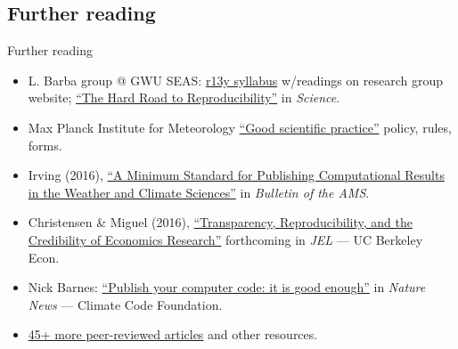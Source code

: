 \documentclass[12pt,aspectratio=169]{beamer}
\begin{document}
\subsection{Further reading}
\begin{frame}{Further reading}
\begin{itemize}
  \small
  \item L. Barba group @ GWU SEAS: \href{http://lorenabarba.com/blog/barbagroup-reproducibility-syllabus/}{r13y syllabus} w/readings on research group website; \href{http://science.sciencemag.org/content/354/6308/142}{``The Hard Road to Reproducibility''} in \emph{Science}.
  \item Max Planck Institute for Meteorology \href{http://mpimet.mpg.de/en/science/publications/good-scientific-practice.html}{``Good scientific practice''} policy, rules, forms.
  \item Irving (2016), \href{http://journals.ametsoc.org/doi/abs/10.1175/BAMS-D-15-00010.1}{``A Minimum Standard for Publishing Computational Results in the Weather and Climate Sciences''} in \emph{Bulletin of the AMS}.
  \item Christensen \& Miguel (2016), \href{http:/dx.doi.org/10.3386/w22989}{``Transparency, Reproducibility, and the Credibility of Economics Research''} forthcoming in \emph{JEL} — UC Berkeley Econ.
  \item Nick Barnes: \href{https://www.nature.com/news/2010/101013/full/467753a.html}{``Publish your computer code: it is good enough''} in \emph{Nature News} — Climate Code Foundation.
  \item \href{http://ropensci.github.io/reproducibility-guide/sections/references/}{45+ more peer-reviewed articles} and other resources.
\end{itemize}
\end{frame}
\end{document}
